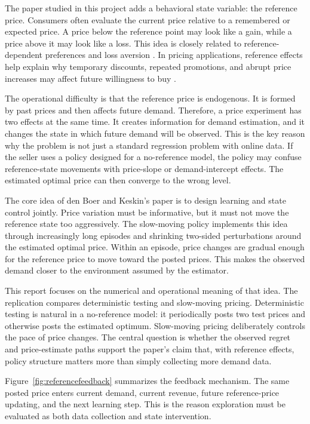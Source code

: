\documentclass[conference]{../../LaTex_Template/IEEEtran}
\begin{document}
The paper studied in this project adds a behavioral state variable: the reference price. Consumers often evaluate the current price relative to a remembered or expected price. A price below the reference point may look like a gain, while a price above it may look like a loss. This idea is closely related to reference-dependent preferences and loss aversion \cite{tverskyKahneman1991}. In pricing applications, reference effects help explain why temporary discounts, repeated promotions, and abrupt price increases may affect future willingness to buy \cite{popescuWu2007}.

The operational difficulty is that the reference price is endogenous. It is formed by past prices and then affects future demand. Therefore, a price experiment has two effects at the same time. It creates information for demand estimation, and it changes the state in which future demand will be observed. This is the key reason why the problem is not just a standard regression problem with online data. If the seller uses a policy designed for a no-reference model, the policy may confuse reference-state movements with price-slope or demand-intercept effects. The estimated optimal price can then converge to the wrong level.

The core idea of den Boer and Keskin's paper is to design learning and state control jointly. Price variation must be informative, but it must not move the reference state too aggressively. The slow-moving policy implements this idea through increasingly long episodes and shrinking two-sided perturbations around the estimated optimal price. Within an episode, price changes are gradual enough for the reference price to move toward the posted prices. This makes the observed demand closer to the environment assumed by the estimator.

This report focuses on the numerical and operational meaning of that idea. The replication compares deterministic testing and slow-moving pricing. Deterministic testing is natural in a no-reference model: it periodically posts two test prices and otherwise posts the estimated optimum. Slow-moving pricing deliberately controls the pace of price changes. The central question is whether the observed regret and price-estimate paths support the paper's claim that, with reference effects, policy structure matters more than simply collecting more demand data.

Figure~\ref{fig:referencefeedback} summarizes the feedback mechanism. The same posted price enters current demand, current revenue, future reference-price updating, and the next learning step. This is the reason exploration must be evaluated as both data collection and state intervention.
\end{document}
